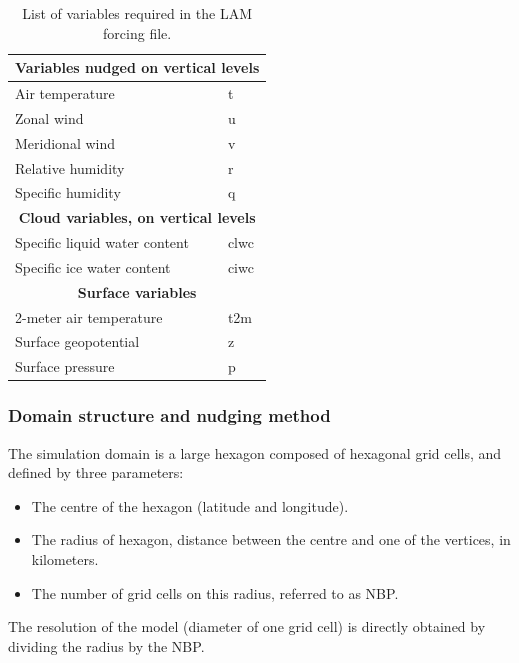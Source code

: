 \begin{table}[htbp]
\centering
\begin{tabular}{|l|l|}
\hline
\multicolumn{2}{|c|}{\textbf{Variables nudged on vertical levels}} \\ \hline
Air temperature                & t     \\ \hline
Zonal wind                    & u     \\ \hline
Meridional wind               & v     \\ \hline
Relative humidity             & r     \\ \hline
Specific humidity             & q     \\ \hline
\multicolumn{2}{|c|}{\textbf{Cloud variables, on vertical levels}} \\ \hline
Specific liquid water content & clwc  \\ \hline
Specific ice water content    & ciwc  \\ \hline
\multicolumn{2}{|c|}{\textbf{Surface variables}} \\ \hline
2-meter air temperature            & t2m   \\ \hline
Surface geopotential          & z     \\ \hline
Surface pressure              & p     \\ \hline
\end{tabular}
\caption{List of variables required in the LAM forcing file.}
\end{table}

\subsubsection{Domain structure and nudging method}

The simulation domain is a large hexagon composed of hexagonal grid cells, and defined by three parameters:
\begin{itemize}
    \item The centre of the hexagon (latitude and longitude).
    \item The radius of hexagon, distance between the centre and one of the vertices, in kilometers.
    \item The number of grid cells on this radius, referred to as NBP.
\end{itemize}

The resolution of the model (diameter of one grid cell) is directly obtained by dividing the radius by the NBP.

